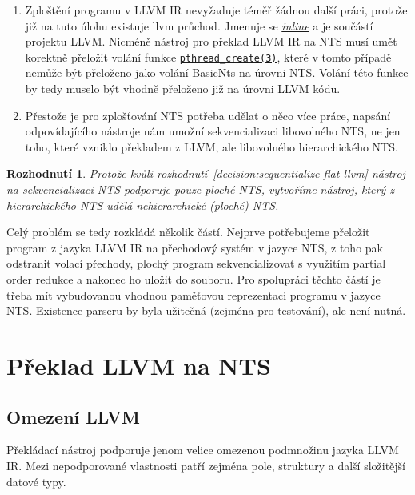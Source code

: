 \documentclass[12pt]{fithesis2}
\newtheorem{decision}  {Rozhodnutí}
\begin{document}
\begin{enumerate}
\item Zploštění programu v LLVM IR nevyžaduje téměř žádnou další práci, protože již na tuto úlohu existuje llvm průchod. Jmenuje se
\href{http://llvm.org/docs/Passes.html#inline-function-integration-inlining}
{\textit{inline}} a je součástí projektu LLVM. Nicméně nástroj pro překlad LLVM IR na NTS musí umět korektně přeložit volání funkce
\href{http://man7.org/linux/man-pages/man3/pthread\_create.3.html}
{\texttt{pthread\_create(3)}}, které v tomto případě nemůže být přeloženo jako volání BasicNts na úrovni NTS. Volání této funkce by tedy muselo být vhodně přeloženo již na úrovni LLVM kódu.

\item Přestože je pro zplošťování NTS potřeba udělat o něco více práce, napsání odpovídajícího nástroje nám umožní sekvencializaci libovolného NTS, ne jen toho, které vzniklo překladem z LLVM, ale libovolného hierarchického NTS.
\end{enumerate}

\begin{decision}\label{decision:do-nts-flattening}
Protože kvůli rozhodnutí~\ref{decision:sequentialize-flat-llvm} nástroj na sekvencializaci NTS podporuje pouze ploché NTS, vytvoříme nástroj, který z hierarchického NTS udělá nehierarchické (ploché) NTS.
\end{decision}

Celý problém se tedy rozkládá několik částí. Nejprve potřebujeme přeložit program z jazyka LLVM IR na přechodový systém v jazyce NTS, z toho pak odstranit volací přechody, plochý program sekvencializovat s využitím partial order redukce a nakonec ho uložit do souboru. Pro spolupráci těchto částí je třeba mít vybudovanou vhodnou paměťovou reprezentaci programu v jazyce NTS. Existence parseru by byla užitečná (zejména pro testování), ale není nutná.




\chapter{Překlad LLVM na NTS}
\label{sec:translation}
\section{Omezení LLVM}
Překládací nástroj podporuje jenom velice omezenou podmnožinu jazyka LLVM IR. Mezi nepodporované vlastnosti patří zejména pole, struktury a další složitější datové typy.
\end{document}
